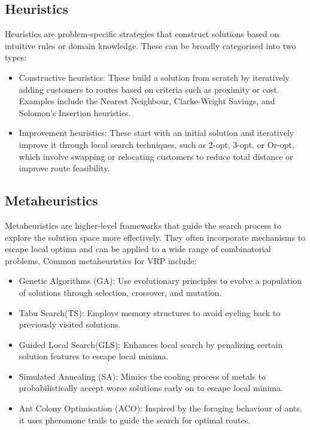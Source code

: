 \subsection{Heuristics}
Heuristics are problem-specific strategies that construct solutions based on
intuitive rules or domain knowledge. These can be broadly categorised into two
types:
\begin{itemize}
	\item{Constructive heuristics}: These build a solution from scratch by iteratively adding customers to routes based on criteria such as proximity or cost. Examples include the Nearest Neighbour, Clarke-Wright Savings, and Solomon's Insertion heuristics.\cite{metaheuristicsAndHeuristics}
	\item {Improvement heuristics}: These start with an initial solution and iteratively improve it through local search techniques, such as 2-opt, 3-opt, or Or-opt, which involve swapping or relocating customers to reduce total distance or improve route feasibility.\cite{metaheuristicsAndHeuristics}
\end{itemize}
\subsection{Metaheuristics}
Metaheuristics are higher-level frameworks that guide the search process to
explore the solution space more effectively. They often incorporate mechanisms
to escape local optima and can be applied to a wide range of combinatorial
problems. \cite{metaheuristicsAndHeuristics} Common metaheuristics for VRP
include:
\begin{itemize}
	\item Genetic Algorithms (GA): Use evolutionary principles to evolve a population of solutions through selection, crossover, and mutation.
	\item Tabu Search(TS): Employs memory structures to avoid cycling back to previously visited solutions.
	\item Guided Local Search(GLS): Enhances local search by penalizing certain solution features to escape local minima.
	\item Simulated Annealing (SA): Mimics the cooling process of metals to probabilistically accept worse solutions early on to escape local minima.
	\item Ant Colony Optimisation (ACO): Inspired by the foraging behaviour of ants, it uses pheromone trails to guide the search for optimal routes.
\end{itemize}

